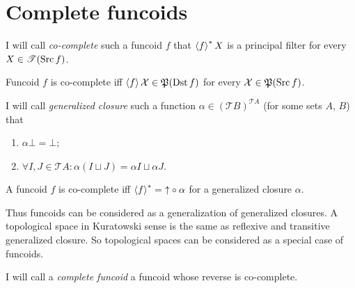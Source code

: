 \section{Complete funcoids}
\begin{defn}
I will call \emph{co-complete} such a
funcoid $f$ that $\left\langle f\right\rangle ^{\ast}X$ is a principal filter for every
$X\in\mathscr{T}(\operatorname{Src} f)$.\end{defn}
\begin{obvious}
Funcoid $f$ is co-complete iff $\left\langle f\right\rangle\mathcal{X}\in\mathfrak{P}(\operatorname{Dst} f)$
for every $\mathcal{X}\in\mathfrak{P}(\operatorname{Src} f)$.\end{obvious}
\begin{defn}
I will call \emph{generalized closure}
such a function $\alpha\in(\mathscr{T}B)^{\mathscr{T}A}$ (for some
sets $A$, $B$) that
\begin{enumerate}
\item $\alpha\bot=\bot$;
\item $\forall I,J\in\mathscr{T}A:\alpha(I\sqcup J)=\alpha I\sqcup\alpha J$.
\end{enumerate}
\end{defn}
\begin{obvious}
A funcoid $f$ is co-complete iff $\left\langle f\right\rangle ^{\ast}=\mathord{\uparrow}\circ\alpha$
for a generalized closure $\alpha$.\end{obvious}
\begin{rem}
Thus funcoids can be considered as a generalization of generalized
closures. A topological space in Kuratowski sense is the same as reflexive
and transitive generalized closure. So topological spaces can be considered
as a special case of funcoids.\end{rem}
\begin{defn}
I will call a \emph{complete funcoid} a funcoid
whose reverse is co-complete.\end{defn}
